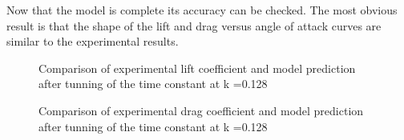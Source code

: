 Now that the model is complete its accuracy can be checked.
The most obvious result is that the shape of the lift and drag versus angle of attack curves are similar to the experimental results.

\begin{figure}[h]
  \begin{center}
  \end{center}
  \caption{Comparison of experimental lift coefficient and model prediction after tunning of the time constant at k =0.128}
  \label{fig:Cl_u=3_meanaoa=12_amp=2_freq=0p5}
\end{figure}

\begin{figure}[h]
  \begin{center}
  \end{center}
  \caption{Comparison of experimental drag coefficient and model prediction after tunning of the time constant at k =0.128}
  \label{fig:Cd_u=3_meanaoa=12_amp=2_freq=0p5}
\end{figure}

